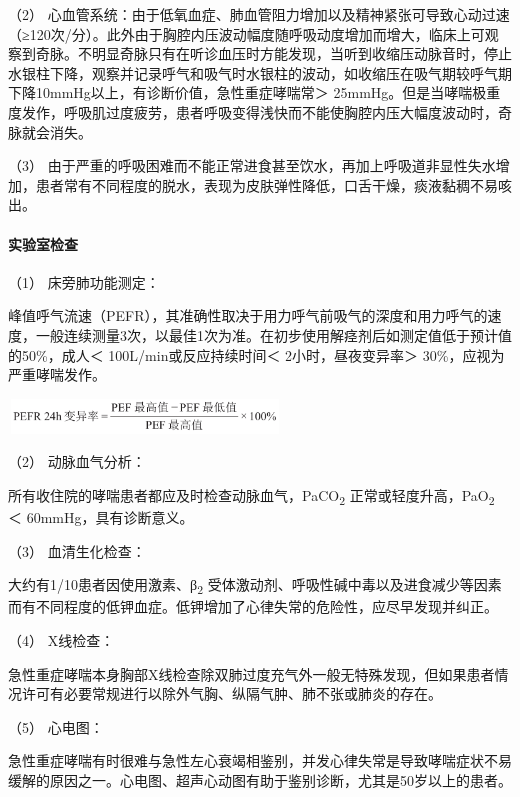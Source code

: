 （2）
心血管系统：由于低氧血症、肺血管阻力增加以及精神紧张可导致心动过速（≥120次/分）。此外由于胸腔内压波动幅度随呼吸动度增加而增大，临床上可观察到奇脉。不明显奇脉只有在听诊血压时方能发现，当听到收缩压动脉音时，停止水银柱下降，观察并记录呼气和吸气时水银柱的波动，如收缩压在吸气期较呼气期下降10mmHg以上，有诊断价值，急性重症哮喘常＞
25mmHg。但是当哮喘极重度发作，呼吸肌过度疲劳，患者呼吸变得浅快而不能使胸腔内压大幅度波动时，奇脉就会消失。

（3）
由于严重的呼吸困难而不能正常进食甚至饮水，再加上呼吸道非显性失水增加，患者常有不同程度的脱水，表现为皮肤弹性降低，口舌干燥，痰液黏稠不易咳出。

\paragraph{实验室检查}

\hypertarget{text00268.htmlux5cux23CHP9-3-2-3-1}{}
（1） 床旁肺功能测定：

峰值呼气流速（PEFR），其准确性取决于用力呼气前吸气的深度和用力呼气的速度，一般连续测量3次，以最佳1次为准。在初步使用解痉剂后如测定值低于预计值的50\%，成人＜
100L/min或反应持续时间＜ 2小时，昼夜变异率＞ 30\%，应视为严重哮喘发作。

\includegraphics[width=2.85417in,height=0.36458in]{./images/Image00393.jpg}

\hypertarget{text00268.htmlux5cux23CHP9-3-2-3-2}{}
（2） 动脉血气分析：

所有收住院的哮喘患者都应及时检查动脉血气，PaCO\textsubscript{2}
正常或轻度升高，PaO\textsubscript{2} ＜ 60mmHg，具有诊断意义。

\hypertarget{text00268.htmlux5cux23CHP9-3-2-3-3}{}
（3） 血清生化检查：

大约有1/10患者因使用激素、β\textsubscript{2}
受体激动剂、呼吸性碱中毒以及进食减少等因素而有不同程度的低钾血症。低钾增加了心律失常的危险性，应尽早发现并纠正。

\hypertarget{text00268.htmlux5cux23CHP9-3-2-3-4}{}
（4） X线检查：

急性重症哮喘本身胸部X线检查除双肺过度充气外一般无特殊发现，但如果患者情况许可有必要常规进行以除外气胸、纵隔气肿、肺不张或肺炎的存在。

\hypertarget{text00268.htmlux5cux23CHP9-3-2-3-5}{}
（5） 心电图：

急性重症哮喘有时很难与急性左心衰竭相鉴别，并发心律失常是导致哮喘症状不易缓解的原因之一。心电图、超声心动图有助于鉴别诊断，尤其是50岁以上的患者。

